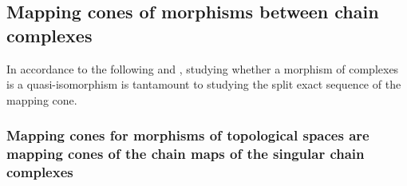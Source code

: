 















\subsection{Mapping cones of morphisms between chain complexes}












In accordance to the following and , studying whether a morphism of complexes is a quasi-isomorphism is tantamount to studying the split exact sequence of the mapping cone.





\subsubsection{Mapping cones for morphisms of topological spaces are mapping cones of the chain maps of the singular chain complexes}

